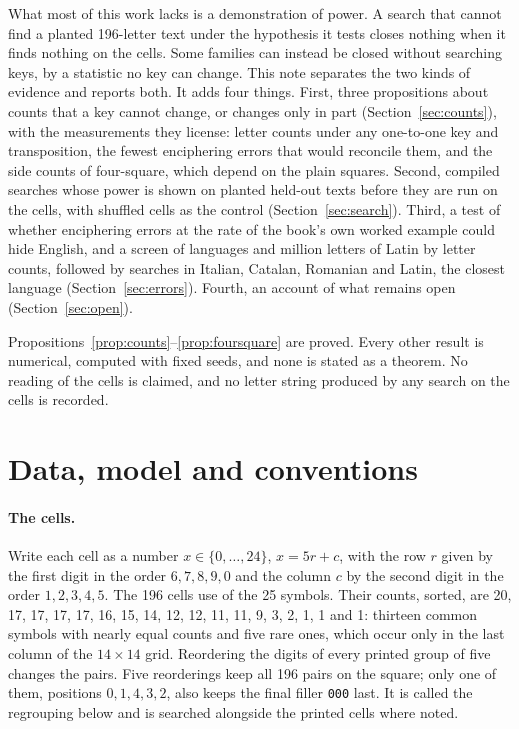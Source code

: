 \documentclass[11pt]{article}
\theoremstyle{definition}
\begin{document}
What most of this work lacks is a demonstration of power. A search that cannot find a planted 196-letter text under the hypothesis it tests closes nothing when it finds nothing on the cells. Some families can instead be closed without searching keys, by a statistic no key can change. This note separates the two kinds of evidence and reports both. It adds four things. First, three propositions about counts that a key cannot change, or changes only in part (Section~\ref{sec:counts}), with the measurements they license: letter counts under any one-to-one key and transposition, the fewest enciphering errors that would reconcile them, and the side counts of four-square, which depend on the plain squares. Second, compiled searches whose power is shown on planted held-out texts before they are run on the cells, with shuffled cells as the control (Section~\ref{sec:search}). Third, a test of whether enciphering errors at the rate of the book's own worked example could hide English, and a screen of \allLanguages{} languages and \latinLettersAll{} million letters of Latin by letter counts, followed by searches in Italian, Catalan, Romanian and Latin, the closest language (Section~\ref{sec:errors}). Fourth, an account of what remains open (Section~\ref{sec:open}).

Propositions~\ref{prop:counts}--\ref{prop:foursquare} are proved. Every other result is numerical, computed with fixed seeds, and none is stated as a theorem. No reading of the cells is claimed, and no letter string produced by any search on the cells is recorded.

\section{Data, model and conventions}\label{sec:data}

\paragraph{The cells.} Write each cell as a number $x \in \{0, \dots, 24\}$, $x = 5r + c$, with the row $r$ given by the first digit in the order $6,7,8,9,0$ and the column $c$ by the second digit in the order $1,2,3,4,5$. The 196 cells use \cellsDistinct{} of the 25 symbols. Their counts, sorted, are 20, 17, 17, 17, 17, 16, 15, 14, 12, 12, 11, 11, 9, 3, 2, 1, 1 and 1: thirteen common symbols with nearly equal counts and five rare ones, which occur only in the last column of the $14 \times 14$ grid. Reordering the digits of every printed group of five changes the pairs. Five reorderings keep all 196 pairs on the square; only one of them, positions $0,1,4,3,2$, also keeps the final filler \texttt{000} last. It is called the regrouping below and is searched alongside the printed cells where noted.
\end{document}
